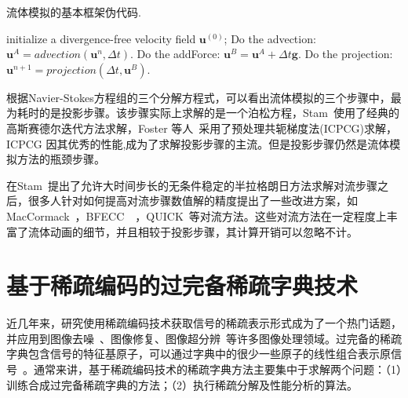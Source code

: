 \begin{algorithm}%
\caption{ 流体模拟的基本框架伪代码.}
\label{Eulerframework}
\begin{algorithmic}[1] %
  \STATE initialize a divergence-free velocity field ${\boldsymbol u}^{(0)}$;
    \STATE Do the advection: ${\boldsymbol u}^{A} = advection({\boldsymbol u}^n, \Delta t)$.
    \STATE  Do the addForce: ${\boldsymbol u}^{B} = {\boldsymbol u}^{A} + {\Delta t} {\boldsymbol g}$. 
    \STATE Do the projection: ${\boldsymbol u}^{n + 1} = projection({\Delta t}, {\boldsymbol u}^{B})$.
\ENDFOR
\end{algorithmic}
\end{algorithm}

根据Navier-Stokes方程组的三个分解方程式，可以看出流体模拟的三个步骤中，最为耗时的是投影步骤。该步骤实际上求解的是一个泊松方程，Stam~\cite{stam2003real}使用了经典的高斯赛德尔迭代方法求解，Foster 等人~\cite{foster2001practical}采用了预处理共轭梯度法(ICPCG)求解，ICPCG 因其优秀的性能,成为了求解投影步骤的主流。但是投影步骤仍然是流体模拟方法的瓶颈步骤。

在Stam~\cite{stam1999stable}提出了允许大时间步长的无条件稳定的半拉格朗日方法求解对流步骤之后，很多人针对如何提高对流步骤数值解的精度提出了一些改进方案，如MacCormack~\cite{selle2008unconditionally}，BFECC~\cite{kim2005flowfixer}~\cite{dupont2003back}，QUICK~\cite{molemaker2008low}等对流方法。这些对流方法在一定程度上丰富了流体动画的细节，并且相较于投影步骤，其计算开销可以忽略不计。

\section{基于稀疏编码的过完备稀疏字典技术}

近几年来，研究使用稀疏编码技术获取信号的稀疏表示形式成为了一个热门话题，并应用到图像去噪~\cite{donoho1995noising}、图像修复、图像超分辨~\cite{yang2008image}等许多图像处理领域。过完备的稀疏字典包含信号的特征基原子，可以通过字典中的很少一些原子的线性组合表示原信号~\cite{aharon2006overcomplete}。通常来讲，基于稀疏编码技术的稀疏字典方法主要集中于求解两个问题：（1）训练合成过完备稀疏字典的方法；（2）执行稀疏分解及性能分析的算法。

